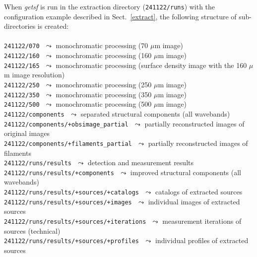 \documentclass[a4paper,10pt]{article}
\begin{document}
When \textsl{getsf} is run in the extraction directory (\verb!241122/runs!) with the configuration example described in
Sect.~\ref{extract}, the following structure of sub-directories is created:\\
\vspace{-2mm}\noindent\\
{\small\verb!241122/070!} $\,\,\leadsto$ monochromatic processing (70 $\mu$m image)\\
{\small\verb!241122/160!} $\,\,\leadsto$ monochromatic processing (160 $\mu$m image)\\
{\small\verb!241122/165!} $\,\,\leadsto$ monochromatic processing (surface density image with the 160 $\mu$m image resolution)\\
{\small\verb!241122/250!} $\,\,\leadsto$ monochromatic processing (250 $\mu$m image)\\
{\small\verb!241122/350!} $\,\,\leadsto$ monochromatic processing (350 $\mu$m image)\\
{\small\verb!241122/500!} $\,\,\leadsto$ monochromatic processing (500 $\mu$m image)\\
{\small\verb!241122/components!} $\,\,\leadsto$ separated structural components (all wavebands)\\
{\small\verb!241122/components/+obsimage_partial!} $\,\,\leadsto$ partially reconstructed images of original images\\
{\small\verb!241122/components/+filaments_partial!} $\,\,\leadsto$ partially reconstructed images of filaments\\
{\small\verb!241122/runs/results!} $\,\,\leadsto$ detection and measurement results\\
{\small\verb!241122/runs/results/+components!} $\,\,\leadsto$ improved structural components (all wavebands)\\
{\small\verb!241122/runs/results/+sources/+catalogs!} $\,\,\leadsto$ catalogs of extracted sources\\
{\small\verb!241122/runs/results/+sources/+images!} $\,\,\leadsto$ individual images of extracted sources\\
{\small\verb!241122/runs/results/+sources/+iterations!} $\,\,\leadsto$ measurement iterations of sources (technical)\\
{\small\verb!241122/runs/results/+sources/+profiles!} $\,\,\leadsto$ individual profiles of extracted sources\\
\end{document}
